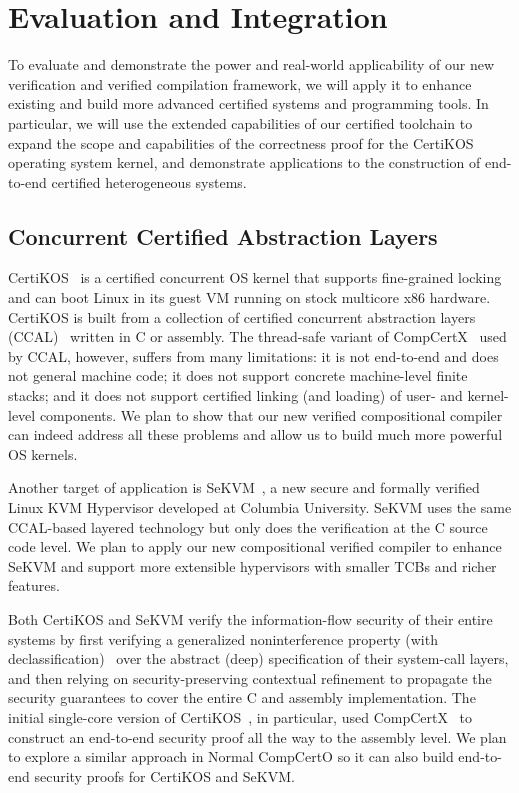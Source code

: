 \section{Evaluation and Integration}

To evaluate and demonstrate the power and real-world applicability of
our new verification and verified compilation framework,
we will apply it to enhance existing and
build more advanced certified systems and programming tools.
In particular,
we will use the extended capabilities of our
certified toolchain to expand the scope and capabilities
of the correctness proof for the CertiKOS operating system kernel,
and demonstrate applications to the construction of
end-to-end certified heterogeneous systems.

\subsection{Concurrent Certified Abstraction Layers}

CertiKOS~\cite{certikos-osdi16} is a certified concurrent OS kernel
that supports fine-grained locking and can boot Linux in its guest VM
running on stock multicore x86 hardware.  CertiKOS is built from a
collection of certified concurrent abstraction layers
(CCAL)~\cite{ccal18} written in C or assembly.  The thread-safe
variant of CompCertX~\cite{dscal15} used by CCAL, however, suffers
from many limitations: it is not end-to-end and does not general
machine code; it does not support concrete machine-level finite
stacks; and it does not support certified linking (and loading) of
user- and kernel-level components. We plan to show that our new
verified compositional compiler can indeed address all these problems
and allow us to build much more powerful OS kernels.

Another target of application is SeKVM~\cite{sekvm21a,sekvm21b,tao21},
a new secure and formally verified Linux KVM Hypervisor developed at
Columbia University. SeKVM uses the same CCAL-based layered technology 
but only does the verification at the C source code level. We plan to
apply our new compositional verified compiler to enhance SeKVM and support
more extensible hypervisors with smaller TCBs and richer features.

Both CertiKOS and SeKVM verify the information-flow security of their
entire systems by first verifying a generalized noninterference
property (with declassification)~\cite{costanzo16} over the abstract
(deep) specification of their system-call layers, and then relying on
security-preserving contextual refinement to propagate the security
guarantees to cover the entire C and assembly implementation. The
initial single-core version of CertiKOS~\cite{costanzo16}, in
particular, used CompCertX~\cite{dscal15} to construct an end-to-end
security proof all the way to the assembly level.  We plan to explore
a similar approach in Normal CompCertO so it can also build end-to-end
security proofs for CertiKOS and SeKVM.

